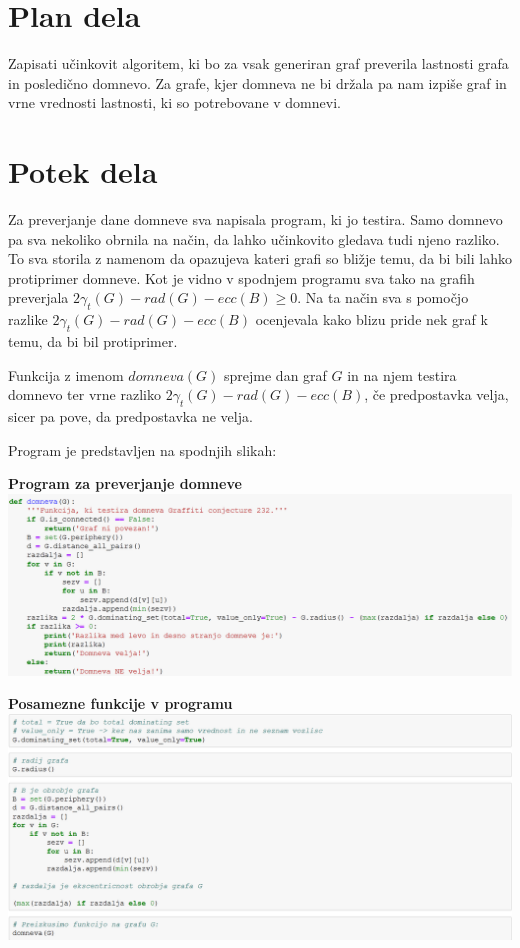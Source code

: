 \documentclass[10pt, a4paper]{article}
\begin{document}
\section{Plan dela}
Zapisati učinkovit algoritem, ki bo za vsak generiran graf preverila lastnosti grafa in posledično domnevo. Za grafe, kjer  domneva ne bi držala pa nam izpiše graf in vrne vrednosti lastnosti, ki so potrebovane v domnevi.

\section{Potek dela}

Za preverjanje dane domneve sva napisala program, ki jo testira. Samo domnevo pa sva nekoliko obrnila na način, da lahko učinkovito gledava tudi njeno razliko. To sva storila z namenom da opazujeva kateri grafi so bližje temu, da bi bili lahko protiprimer domneve. Kot je vidno v spodnjem programu sva tako na grafih preverjala $2\gamma_{t}(G) - rad(G) - ecc(B) \geq 0$. Na ta način sva s pomočjo razlike $2\gamma_{t}(G) - rad(G) - ecc(B)$ ocenjevala kako blizu pride nek graf k temu, da bi bil protiprimer.

Funkcija z imenom $domneva(G)$ sprejme dan graf $G$ in na njem testira domnevo ter vrne razliko $2\gamma_{t}(G) - rad(G) - ecc(B)$, če predpostavka velja, sicer pa pove, da predpostavka ne velja.

Program je predstavljen na spodnjih slikah:

\begin{center}
\textbf{Program za preverjanje domneve}
\includegraphics[width=16cm]{domneva}
\end{center}

\begin{center}
\textbf{Posamezne funkcije v programu}
\includegraphics[width=16cm]{deli_programa}
\end{center}
\end{document}
